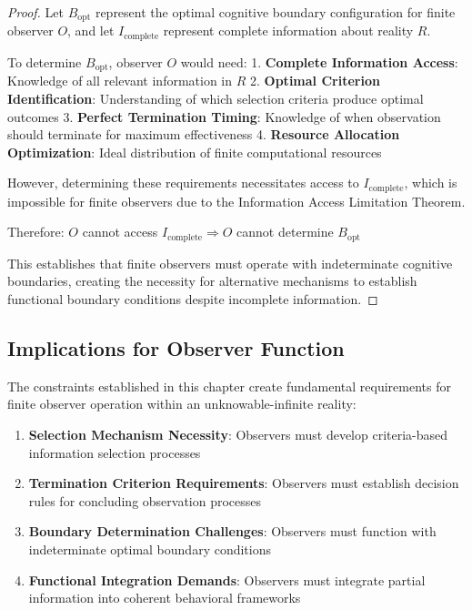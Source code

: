 \documentclass[12pt,a4paper]{article}
\begin{document}
\begin{proof}
Let $B_{\text{opt}}$ represent the optimal cognitive boundary configuration for finite observer $O$, and let $I_{\text{complete}}$ represent complete information about reality $R$.

To determine $B_{\text{opt}}$, observer $O$ would need:
1. \textbf{Complete Information Access}: Knowledge of all relevant information in $R$
2. \textbf{Optimal Criterion Identification}: Understanding of which selection criteria produce optimal outcomes
3. \textbf{Perfect Termination Timing}: Knowledge of when observation should terminate for maximum effectiveness
4. \textbf{Resource Allocation Optimization}: Ideal distribution of finite computational resources

However, determining these requirements necessitates access to $I_{\text{complete}}$, which is impossible for finite observers due to the Information Access Limitation Theorem.

Therefore: $O$ cannot access $I_{\text{complete}} \Rightarrow O$ cannot determine $B_{\text{opt}}$

This establishes that finite observers must operate with indeterminate cognitive boundaries, creating the necessity for alternative mechanisms to establish functional boundary conditions despite incomplete information.
\end{proof}

\subsection{Implications for Observer Function}

The constraints established in this chapter create fundamental requirements for finite observer operation within an unknowable-infinite reality:

\begin{enumerate}
\item \textbf{Selection Mechanism Necessity}: Observers must develop criteria-based information selection processes
\item \textbf{Termination Criterion Requirements}: Observers must establish decision rules for concluding observation processes  
\item \textbf{Boundary Determination Challenges}: Observers must function with indeterminate optimal boundary conditions
\item \textbf{Functional Integration Demands}: Observers must integrate partial information into coherent behavioral frameworks
\end{enumerate}
\end{document}
